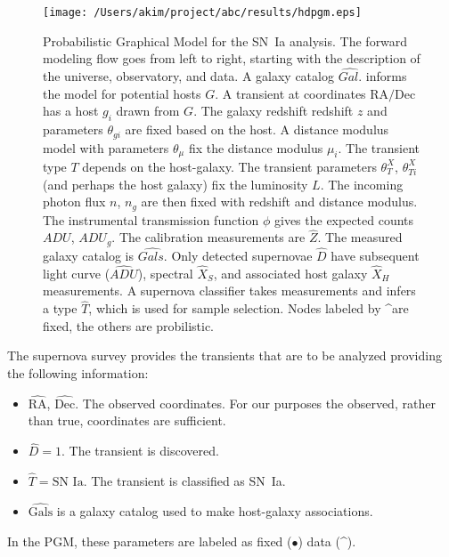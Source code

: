 \documentclass[preprint]{aastex}
\begin{document}
\begin{figure}[htbp] %
   \centering
   \texttt{[image: /Users/akim/project/abc/results/hdpgm.eps]} 
   \caption{Probabilistic Graphical Model for the SN~Ia analysis.  
   The forward modeling
   flow goes from left to right, starting with the description of the universe, observatory,
   and data.
   A galaxy catalog $\hat{\mathit{Gal.}}$ informs the model for potential hosts $G$.  A transient
   at coordinates  $\text{RA/Dec}$  has a host $g_i$ drawn from $G$.
   The galaxy redshift redshift $z$ and parameters $\theta_{gi}$ are fixed based on the host.
   A distance modulus model with parameters $\theta_\mu$ fix the distance modulus $\mu_i$.
   The transient type $T$ depends on the host-galaxy.   The transient
   parameters $\theta_T^X$, $\theta_{Ti}^X$ (and perhaps the host galaxy) fix the luminosity $L$.       The 
   incoming photon flux $n$, $n_g$  are then fixed
   with redshift and distance modulus.
   The instrumental transmission function $\phi$ gives the expected
   counts $\mathit{ADU}$, $\mathit{ADU}_g$.  The calibration measurements
   are $\hat{Z}$.  The measured galaxy catalog is $\hat{\mathit{Gals.}}$  Only detected
   supernovae $\hat{D}$ have subsequent light curve ($\hat{ADU}$), spectral
   $\hat{X}_S$, and associated host galaxy $\hat{X}_H$ measurements.  A supernova
   classifier takes measurements and infers a type $\hat{T}$, which is used for sample selection.
       Nodes labeled by
   \textasciicircum are fixed, the others are probilistic.
   \label{pgm:fig}}
\end{figure}

The supernova survey provides the transients that are to be analyzed providing
the following information:
\begin{itemize}
\item $\hat{\text{RA}}$, $\hat{\text{Dec}}$.  The observed
coordinates.  For our purposes the observed, rather than true, coordinates are sufficient.
\item $\hat{D}=1$.  The transient is discovered.
\item $\hat{T}=\text{SN~Ia}$. The transient is classified as SN~Ia.
\item $\hat{\text{Gals}}$ is a galaxy catalog used to make host-galaxy associations.
\end{itemize}
In the PGM, these parameters are labeled as fixed ($\bullet$) data (\textasciicircum).
\end{document}
